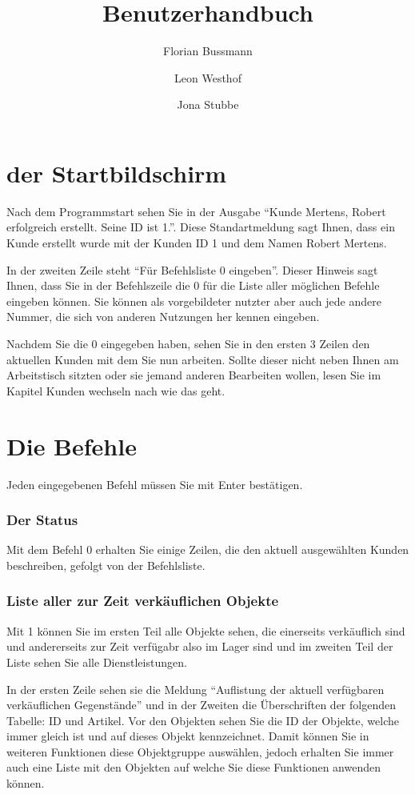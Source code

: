 ﻿\documentclass[a4paper,12pt,titlepage]{article}
\title{Benutzerhandbuch}
\author{Florian Bussmann \and Leon Westhof \and Jona Stubbe}
\begin{document}
\maketitle
\tableofcontents

\part{der Startbildschirm}
Nach dem Programmstart sehen Sie in der Ausgabe \enquote{Kunde Mertens, Robert erfolgreich erstellt. Seine ID ist 1.}.
Diese Standartmeldung sagt Ihnen, dass ein Kunde erstellt wurde mit der Kunden ID 1 und dem Namen Robert Mertens.

In der zweiten Zeile steht \enquote{Für Befehlsliste 0 eingeben}.
Dieser Hinweis sagt Ihnen, dass Sie in der Befehlszeile die 0 für die Liste aller möglichen Befehle eingeben können.
Sie können als vorgebildeter nutzter aber auch jede andere Nummer, die sich von anderen Nutzungen her kennen eingeben.

Nachdem Sie die 0 eingegeben haben, sehen Sie in den ersten 3 Zeilen den aktuellen Kunden mit dem Sie nun arbeiten.
Sollte dieser nicht neben Ihnen am Arbeitstisch sitzten oder sie jemand anderen Bearbeiten wollen, lesen Sie im Kapitel Kunden wechseln nach wie das geht.

\part{Die Befehle}
Jeden eingegebenen Befehl müssen Sie mit Enter bestätigen.

\section{Der Status}
Mit dem Befehl 0 erhalten Sie einige Zeilen, die den aktuell ausgewählten Kunden beschreiben,
gefolgt von der Befehlsliste.

\section{Liste aller zur Zeit verkäuflichen Objekte}
Mit 1 können Sie im ersten Teil alle Objekte sehen,
 die einerseits verkäuflich sind und andererseits zur Zeit verfügabr also im Lager sind und im zweiten Teil der Liste sehen Sie alle Dienstleistungen.

In der ersten Zeile sehen sie die Meldung \enquote{Auflistung der aktuell verfügbaren verkäuflichen Gegenstände}
 und in der Zweiten die Überschriften der folgenden Tabelle: ID und Artikel.
Vor den Objekten sehen Sie die ID der Objekte, welche immer gleich ist
 und auf dieses Objekt kennzeichnet.
Damit können Sie in weiteren Funktionen diese Objektgruppe auswählen,
 jedoch erhalten Sie immer auch eine Liste mit den Objekten auf welche Sie diese Funktionen anwenden können.
\end{document}
